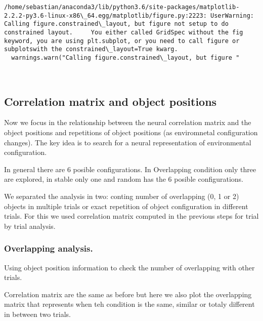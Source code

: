 \documentclass[11pt]{article}
\begin{document}
    \begin{Verbatim}[commandchars=\\\{\}]
/home/sebastian/anaconda3/lib/python3.6/site-packages/matplotlib-2.2.2-py3.6-linux-x86\_64.egg/matplotlib/figure.py:2223: UserWarning: Calling figure.constrained\_layout, but figure not setup to do constrained layout.     You either called GridSpec without the fig keyword, you are using plt.subplot, or you need to call figure or subplotswith the constrained\_layout=True kwarg.
  warnings.warn("Calling figure.constrained\_layout, but figure "

    \end{Verbatim}

    \begin{center}
    \end{center}
    { \hspace*{\fill} \\}
    
    \subsection{Correlation matrix and object
positions}\label{correlation-matrix-and-object-positions}

Now we focus in the relationship between the neural correlation matrix
and the object positions and repetitions of object positions (as
enviromnetal configuration changes). The key idea is to search for a
neural representation of environmental configuration.

In general there are 6 posible configurations. In Overlapping condition
only three are explored, in stable only one and random has the 6 posible
configurations.

We separated the analysis in two: conting number of overlapping (0, 1 or
2) objects in multiple trials or exact repetition of object
configuration in different trials. For this we used correlation matrix
computed in the previous steps for trial by trial analysis.

\subsubsection{Overlapping analysis.}\label{overlapping-analysis.}

Using object position information to check the number of overlapping
with other trials.

Correlation matrix are the same as before but here we also plot the
overlapping matrix that represents when teh condition is the same,
similar or totaly different in between two trials.
\end{document}
